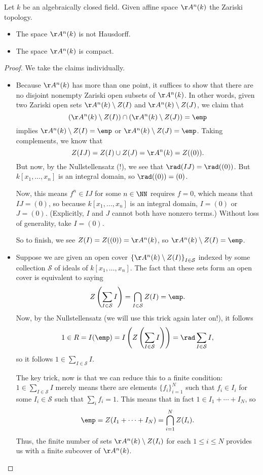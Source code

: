 \documentclass[../notes.tex]{subfiles}
\begin{document}
\begin{proposition}
	Let $k$ be an algebraically closed field. Given affine space $\AA^n(k)$ the Zariski topology.
	\begin{itemize}
		\item The space $\AA^n(k)$ is not Hausdorff.
		\item The space $\AA^n(k)$ is compact.
	\end{itemize}
\end{proposition}
\begin{proof}
	We take the claims individually.
	\begin{itemize}
		\item Because $\AA^n(k)$ has more than one point, it suffices to show that there are no disjoint nonempty Zariski open subsets of $\AA^n(k)$. In other words, given two Zariski open sets $\AA^n(k)\setminus Z(I)$ and $\AA^n(k)\setminus Z(J)$, we claim that
		\[\left(\AA^n(k)\setminus Z(I)\right)\cap\left(\AA^n(k)\setminus Z(J)\right)=\emp\]
		implies $\AA^n(k)\setminus Z(I)=\emp$ or $\AA^n(k)\setminus Z(J)=\emp$. Taking complements, we know that
		\[Z(IJ)=Z(I)\cup Z(J)=\AA^n(k)=Z((0)).\]
		But now, by the Nullstellensatz (!), we see that $\rad(IJ)=\rad((0))$. But $k[x_1,\ldots,x_n]$ is an integral domain, so $\rad((0))=(0)$.
		
		Now, this means $f^n\in IJ$ for some $n\in\NN$ requires $f=0$, which means that $IJ=(0)$, so because $k[x_1,\ldots,x_n]$ is an integral domain, $I=(0)$ or $J=(0)$. (Explicitly, $I$ and $J$ cannot both have nonzero terms.) Without loss of generality, take $I=(0)$.

		So to finish, we see $Z(I)=Z((0))=\AA^n(k)$, so $\AA^n(k)\setminus Z(I)=\emp$.
		\item Suppose we are given an open cover $\left\{\AA^n(k)\setminus Z(I)\right\}_{I\in\mathcal S}$ indexed by some collection $\mathcal S$ of ideals of $k[x_1,\ldots,x_n]$. The fact that these sets form an open cover is equivalent to saying
		\[Z\left(\sum_{I\in\mathcal S}I\right)=\bigcap_{I\in\mathcal S}Z(I)=\emp.\]
		Now, by the Nullstellensatz (we will use this trick again later on!), it follows
		\[1\in R=I(\emp)=I\left(Z\left(\sum_{I\in\mathcal S} I\right)\right)=\rad\sum_{I\in\mathcal S} I,\]
		so it follows $1\in\sum_{I\in\mathcal S} I$.

		The key trick, now is that we can reduce this to a finite condition: $1\in\sum_{I\in\mathcal S}I$ merely means there are elements $\{f_i\}_{i=1}^N$ such that $f_i\in I_i$ for some $I_i\in\mathcal S$ such that $\sum_if_i=1$. This means that in fact $1\in I_1+\cdots+I_N$, so
		\[\emp=Z(I_1+\cdots+I_N)=\bigcap_{i=1}^NZ(I_i).\]
		Thus, the finite number of sets $\AA^n(k)\setminus Z(I_i)$ for each $1\le i\le N$ provides us with a finite subcover of $\AA^n(k)$.
		\qedhere
	\end{itemize}
\end{proof}
\end{document}
